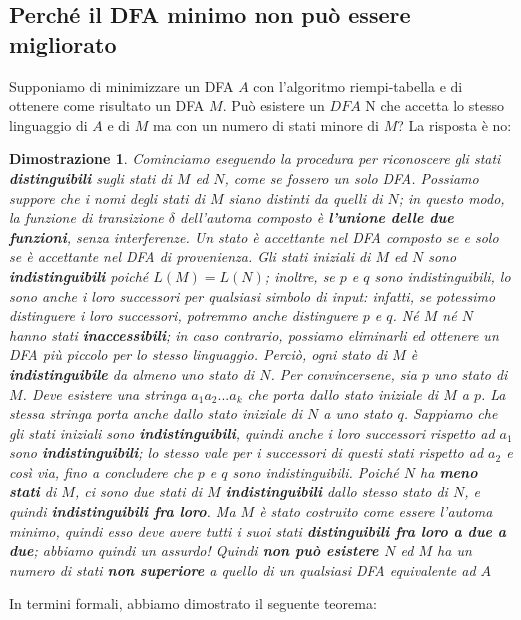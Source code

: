 \documentclass[12pt]{article}
\newtheorem{Dimostrazione}{Dimostrazione}[subsection]
\begin{document}
\subsection{Perché il DFA minimo non può essere migliorato}
Supponiamo di minimizzare un DFA $A$ con l'algoritmo riempi-tabella e di ottenere come risultato un DFA $M$. Può esistere un $DFA$ N che accetta lo stesso linguaggio di $A$ e di $M$ ma con un numero di stati minore di $M$? La risposta è no:
\begin{Dimostrazione}
    Cominciamo eseguendo la procedura per riconoscere gli stati \textbf{distinguibili} sugli stati di $M$ ed $N$, come se fossero un solo DFA. Possiamo suppore che i nomi degli stati di $M$ siano distinti da quelli di $N$; in questo modo, la funzione di transizione $\delta$ dell'automa composto è \textbf{l'unione delle due funzioni}, senza interferenze. Un stato è accettante nel DFA composto se e solo se è accettante nel DFA di provenienza.
    Gli stati iniziali di $M$ ed $N$ sono \textbf{indistinguibili} poiché $L(M) = L(N)$; inoltre, se $p$ e $q$ sono indistinguibili, lo sono anche i loro successori per qualsiasi simbolo di input: infatti, se potessimo distinguere i loro successori, potremmo anche distinguere $p$ e $q$. Né $M$ né $N$ hanno stati \textbf{inaccessibili}; in caso contrario, possiamo eliminarli ed ottenere un DFA più piccolo per lo stesso linguaggio. \newline
    Perciò, ogni stato di $M$ è \textbf{indistinguibile} da almeno uno stato di $N$. Per convincersene, sia $p$ uno stato di $M$. Deve esistere una stringa $a_1a_2...a_k$ che porta dallo stato iniziale di $M$ a $p$. La stessa stringa porta anche dallo stato iniziale di $N$ a uno stato $q$. Sappiamo che gli stati iniziali sono \textbf{indistinguibili}, quindi anche i loro successori rispetto ad $a_1$ sono \textbf{indistinguibili}; lo stesso vale per i successori di questi stati rispetto ad $a_2$ e così via, fino a concludere che $p$ e $q$ sono indistinguibili.
    Poiché $N$ ha \textbf{meno stati} di $M$, ci sono due stati di $M$ \textbf{indistinguibili} dallo stesso stato di $N$, e quindi \textbf{indistinguibili fra loro}. Ma $M$ è stato costruito come essere l'automa minimo, quindi esso deve avere tutti i suoi stati \textbf{distinguibili fra loro a due a due}; abbiamo quindi un assurdo! Quindi \textbf{non può esistere $N$} ed $M$ ha un numero di stati \textbf{non superiore} a quello di un qualsiasi DFA equivalente ad $A$
\end{Dimostrazione}
In termini formali, abbiamo dimostrato il seguente teorema:
\end{document}
